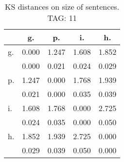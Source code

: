 \begin{table}[h!]
\begin{center}
\begin{tabular}{| l | c | c | c | c |}\hline
 & g. & p. & i. & h. \\\hline
g. & 0.000  & 1.247  & 1.608  & 1.852 \\\hline
 & 0.000  & 0.021  & 0.024  & 0.029 \\\hline
p. & 1.247  & 0.000  & 1.768  & 1.939 \\\hline
 & 0.021  & 0.000  & 0.035  & 0.039 \\\hline
i. & 1.608  & 1.768  & 0.000  & 2.725 \\\hline
 & 0.024  & 0.035  & 0.000  & 0.050 \\\hline
h. & 1.852  & 1.939  & 2.725  & 0.000 \\\hline
 & 0.029  & 0.039  & 0.050  & 0.000 \\\hline
\end{tabular}
\caption{KS distances on size of sentences. TAG: 11}
\end{center}
\end{table}